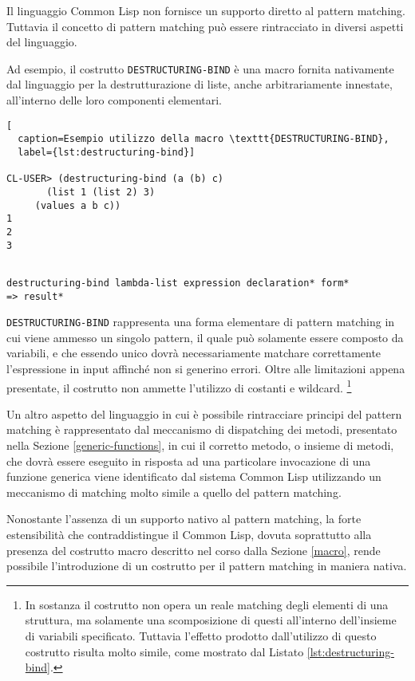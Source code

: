 Il linguaggio Common Lisp non fornisce un supporto diretto al pattern matching.
Tuttavia il concetto di pattern matching può essere rintracciato in diversi
aspetti del linguaggio.

Ad esempio, il costrutto \texttt{DESTRUCTURING-BIND} è una macro fornita
nativamente dal linguaggio per la destrutturazione di liste, anche
arbitrariamente innestate, all’interno delle loro componenti elementari.

\begin{lstlisting}[
  caption=Esempio utilizzo della macro \texttt{DESTRUCTURING-BIND},
  label={lst:destructuring-bind}]

CL-USER> (destructuring-bind (a (b) c)
       (list 1 (list 2) 3)
     (values a b c))
1
2
3

\end{lstlisting}

\begin{lstlisting}[caption=Sintassi della macro \texttt{DESTRUCTURING-BIND}]

destructuring-bind lambda-list expression declaration* form*
=> result*

\end{lstlisting}

\texttt{DESTRUCTURING-BIND} rappresenta una forma elementare di pattern matching
in cui viene ammesso un singolo pattern, il quale può solamente essere composto
da variabili, e che essendo unico dovrà necessariamente matchare correttamente
l’espressione in input affinché non si generino errori. Oltre alle limitazioni
appena presentate, il costrutto non ammette l'utilizzo di costanti e wildcard.
\footnote{In sostanza il costrutto non opera un reale matching degli elementi di
una struttura, ma solamente una scomposizione di questi all'interno dell'insieme
di variabili specificato. Tuttavia l'effetto prodotto dall'utilizzo di questo
costrutto risulta molto simile, come mostrato dal Listato
\ref{lst:destructuring-bind}.}

Un altro aspetto del linguaggio in cui è possibile rintracciare principi del
pattern matching è rappresentato dal meccanismo di dispatching dei metodi,
presentato nella Sezione \ref{generic-functions}, in cui il corretto metodo, o
insieme di metodi, che dovrà essere eseguito in risposta ad una particolare
invocazione di una funzione generica viene identificato dal sistema Common Lisp
utilizzando un meccanismo di matching molto simile a quello del pattern
matching.

Nonostante l'assenza di un supporto nativo al pattern matching, la forte
estensibilità che contraddistingue il Common Lisp, dovuta soprattutto alla
presenza del costrutto macro descritto nel corso dalla Sezione \ref{macro},
rende possibile l'introduzione di un costrutto per il pattern matching in
maniera nativa.

